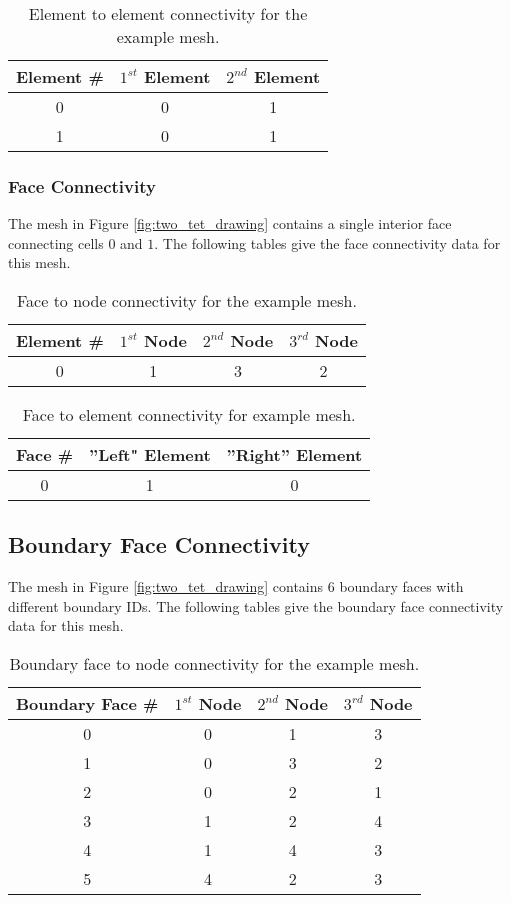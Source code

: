 \documentclass[letterpaper]{article}
\newcommand{\figref}[1]{Figure \ref{#1}}                %
\begin{document}
\begin{table}[h!]
\centering 
\begin{tabular}{|c|cc|}
\hline
Element \# & $1^{st}$ Element & $2^{nd}$ Element \\
\hline
0 & 0  & 1 \\
1 & 0 & 1  \\
\hline 
\end{tabular}
\caption{Element to element connectivity for the example mesh.}
\end{table}

\subsubsection{Face Connectivity}
The mesh in \figref{fig:two_tet_drawing} contains a single interior face connecting cells $0$ and $1$.  The following tables give the face connectivity data for this mesh.   
\begin{table}[h!]
\centering 
\begin{tabular}{|c|ccc|}
\hline
Element \# &$1^{st}$ Node & $2^{nd}$ Node & $3^{rd}$ Node \\
\hline
0 & 1& 3 & 2 \\
\hline 
\end{tabular}
\caption{Face to node connectivity for the example mesh.}
\end{table}

\begin{table}[h!]
\centering
\begin{tabular}{|c|cc|}
\hline
Face \#  & ''Left" Element  & ''Right'' Element  \\
\hline
 0 & 1 & 0 \\
\hline 
\end{tabular}
\caption{Face to element connectivity for example mesh.}
\end{table}


\subsection{Boundary Face Connectivity }
The mesh in \figref{fig:two_tet_drawing} contains 6 boundary faces with different boundary IDs.  The following tables give the boundary face connectivity data for this mesh.   
\begin{table}[h!]
\centering 
\begin{tabular}{|c|ccc|}
\hline
Boundary Face \# &$1^{st}$ Node & $2^{nd}$ Node & $3^{rd}$ Node \\
\hline
0 & 0 & 1 & 3 \\
1 & 0 & 3 & 2 \\
2 & 0 & 2 & 1 \\
3 & 1 & 2 & 4 \\
4 & 1 & 4 & 3 \\
5 & 4& 2 & 3 \\
\hline 
\end{tabular}
\caption{Boundary face to node connectivity for the example mesh.}
\end{table}
\end{document}
